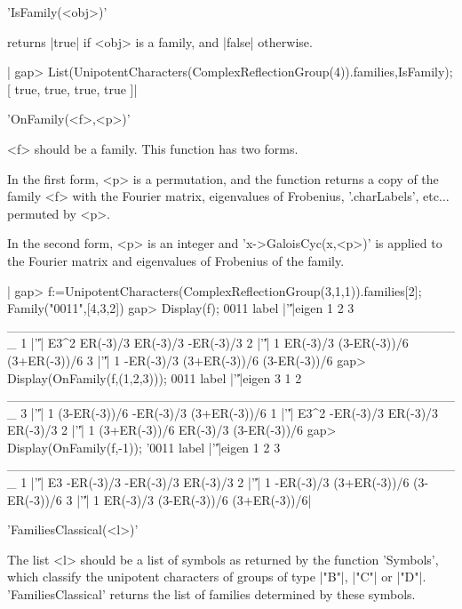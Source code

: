 
'IsFamily(<obj>)'

returns |true| if <obj> is a family, and |false| otherwise.

|    gap> List(UnipotentCharacters(ComplexReflectionGroup(4)).families,IsFamily);
    [ true, true, true, true ]|


'OnFamily(<f>,<p>)'

<f> should be a family. This function has two forms.

In the first form, <p> is a permutation, and the function returns a copy of
the   family  <f>  with  the  Fourier  matrix,  eigenvalues  of  Frobenius,
'.charLabels', etc$\ldots$ permuted by <p>.

In  the second form, <p> is an integer and 'x->GaloisCyc(x,<p>)' is applied
to the Fourier matrix and eigenvalues of Frobenius of the family.

|    gap> f:=UnipotentCharacters(ComplexReflectionGroup(3,1,1)).families[2];
    Family("0011",[4,3,2])
    gap> Display(f);
    0011
    label |'\|'|eigen         1            2            3
    _________________________________________________
    1     |'\|'| E3^2  ER(-3)/3     ER(-3)/3    -ER(-3)/3
    2     |'\|'|    1  ER(-3)/3 (3-ER(-3))/6 (3+ER(-3))/6
    3     |'\|'|    1 -ER(-3)/3 (3+ER(-3))/6 (3-ER(-3))/6
    gap> Display(OnFamily(f,(1,2,3)));
    0011
    label |'\|'|eigen            3         1            2
    _________________________________________________
    3     |'\|'|    1 (3-ER(-3))/6 -ER(-3)/3 (3+ER(-3))/6
    1     |'\|'| E3^2    -ER(-3)/3  ER(-3)/3     ER(-3)/3
    2     |'\|'|    1 (3+ER(-3))/6  ER(-3)/3 (3-ER(-3))/6
    gap> Display(OnFamily(f,-1));
    '0011
    label |'\|'|eigen         1            2            3
    _________________________________________________
    1     |'\|'|   E3 -ER(-3)/3    -ER(-3)/3     ER(-3)/3
    2     |'\|'|    1 -ER(-3)/3 (3+ER(-3))/6 (3-ER(-3))/6
    3     |'\|'|    1  ER(-3)/3 (3-ER(-3))/6 (3+ER(-3))/6|


'FamiliesClassical(<l>)'

The  list  <l>  should  be  a  list  of symbols as returned by the function
'Symbols', which classify the unipotent characters of groups of type |"B"|,
|"C"| or |"D"|. 'FamiliesClassical' returns the list of families determined
by these symbols.


